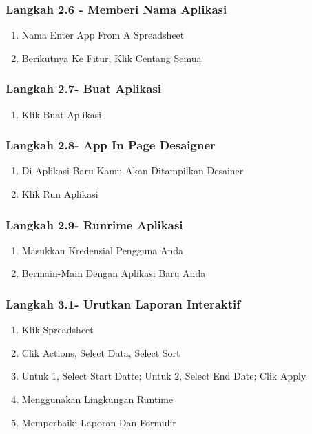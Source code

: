 \documentclass{article}
\begin{document}
\subsubsection{Langkah 2.6 - Memberi Nama Aplikasi}
\begin{enumerate}
    \item Nama Enter {App From A Spreadsheet}
    \item Berikutnya Ke Fitur, Klik Centang Semua
    \end{enumerate}
\subsubsection{Langkah 2.7- Buat Aplikasi}
\begin{enumerate}
    \item Klik Buat Aplikasi
    \end{enumerate}
\subsubsection{Langkah 2.8- App In Page Desaigner}
\begin{enumerate}
    \item Di Aplikasi Baru Kamu Akan Ditampilkan Desainer
    \item Klik Run Aplikasi
    \end{enumerate}
\subsubsection{Langkah 2.9- Runrime Aplikasi}
\begin{enumerate}
    \item Masukkan Kredensial Pengguna Anda
    \item Bermain-Main Dengan Aplikasi Baru Anda
    \end{enumerate}
    
    
\subsubsection{Langkah 3.1-  Urutkan Laporan Interaktif}
\begin{enumerate}
    \item Klik Spreadsheet
    \item Clik Actions, Select Data, Select Sort
    \item Untuk 1, Select Start Datte; Untuk 2, Select End Date; Clik Apply
    \item Menggunakan Lingkungan Runtime
    \item Memperbaiki Laporan Dan Formulir
    \end{enumerate}
\end{document}
